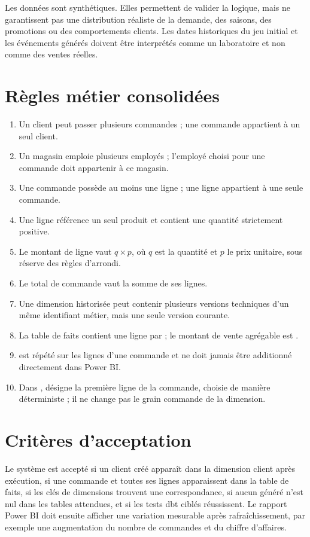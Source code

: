 Les données sont synthétiques. Elles permettent de valider la logique, mais ne garantissent pas une distribution réaliste de la demande, des saisons, des promotions ou des comportements clients. Les dates historiques du jeu initial et les événements générés doivent être interprétés comme un laboratoire et non comme des ventes réelles.

\section{Règles métier consolidées}
\begin{enumerate}[leftmargin=1.1cm]
  \item Un client peut passer plusieurs commandes ; une commande appartient à un seul client.
  \item Un magasin emploie plusieurs employés ; l'employé choisi pour une commande doit appartenir à ce magasin.
  \item Une commande possède au moins une ligne ; une ligne appartient à une seule commande.
  \item Une ligne référence un seul produit et contient une quantité strictement positive.
  \item Le montant de ligne vaut \(q \times p\), où \(q\) est la quantité et \(p\) le prix unitaire, sous réserve des règles d'arrondi.
  \item Le total de commande vaut la somme de ses lignes.
  \item Une dimension historisée peut contenir plusieurs versions techniques d'un même identifiant métier, mais une seule version courante.
  \item La table de faits contient une ligne par ; le montant de vente agrégable est .
  \item {} est répété sur les lignes d'une commande et ne doit jamais être additionné directement dans Power BI.
  \item Dans ,  désigne la première ligne de la commande, choisie de manière déterministe ; il ne change pas le grain commande de la dimension.
\end{enumerate}

\section{Critères d'acceptation}
Le système est accepté si un client créé apparaît dans la dimension client après exécution, si une commande et toutes ses lignes apparaissent dans la table de faits, si les clés de dimensions trouvent une correspondance, si aucun  généré n'est nul dans les tables attendues, et si les tests dbt ciblés réussissent. Le rapport Power BI doit ensuite afficher une variation mesurable après rafraîchissement, par exemple une augmentation du nombre de commandes et du chiffre d'affaires.


